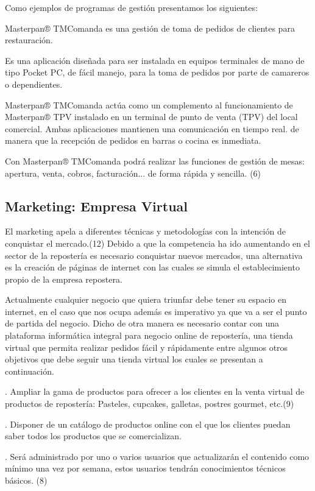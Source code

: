 \documentclass{bmcart}
\begin{document}
Como ejemplos de programas de gestión presentamos los siguientes:

Masterpan® TMComanda es una gestión de toma de pedidos de clientes para restauración.

Es una aplicación diseñada para ser instalada en equipos terminales de mano de tipo Pocket PC, de fácil manejo, para la toma de pedidos por parte de camareros o dependientes.

Masterpan® TMComanda actúa como un complemento al funcionamiento de Masterpan® TPV instalado en un terminal de punto de venta (TPV) del local comercial. Ambas aplicaciones mantienen una comunicación en tiempo real. de manera que la recepción de pedidos en barras o cocina es inmediata.

Con Masterpan® TMComanda podrá realizar las funciones de gestión de mesas: apertura, venta, cobros, facturación... de forma rápida y sencilla. (6)


\subsection{Marketing: Empresa Virtual}

El marketing apela a diferentes técnicas y metodologías con la intención de conquistar el mercado.(12)
Debido a que la competencia ha ido aumentando en el sector de la repostería es necesario conquistar nuevos mercados, una alternativa es la creación de páginas de internet con las cuales se simula el establecimiento propio de la empresa repostera.

Actualmente cualquier negocio que quiera triunfar debe tener su espacio en
internet, en el caso que nos ocupa además es imperativo ya que va a ser el
punto de partida del negocio.
Dicho de otra manera es necesario contar con una plataforma informática integral para negocio online de repostería, una tienda virtual que permita realizar pedidos fácil y rápidamente entre algunos otros objetivos que debe seguir una tienda virtual los cuales se presentan a continuación.


. Ampliar la gama de productos para ofrecer a los clientes en la venta virtual de productos de repostería: Pasteles, cupcakes, galletas, postres gourmet, etc.(9)

. Disponer de un catálogo de productos online con el que los clientes puedan saber todos los productos que se comercializan.


. Será administrado por uno o varios usuarios que actualizarán el contenido como mínimo una vez por semana, estos usuarios tendrán conocimientos
técnicos básicos. (8)
\end{document}
